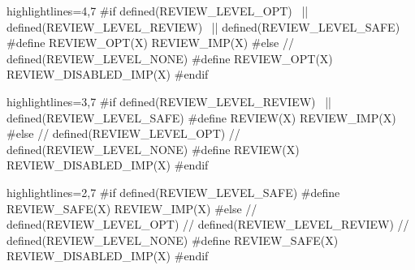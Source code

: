 \begin{frame}[fragile]
\begin{overprint}
\begin{cppcodebox*}{highlightlines={4,7}}
#if defined(REVIEW_LEVEL_OPT)    \
 || defined(REVIEW_LEVEL_REVIEW) \
 || defined(REVIEW_LEVEL_SAFE)
#define REVIEW_OPT(X) REVIEW_IMP(X)
#else
 // defined(REVIEW_LEVEL_NONE)
#define REVIEW_OPT(X) REVIEW_DISABLED_IMP(X)
#endif
\end{cppcodebox*}

\begin{cppcodebox*}{highlightlines={3,7}}
#if defined(REVIEW_LEVEL_REVIEW) \
 || defined(REVIEW_LEVEL_SAFE)
#define REVIEW(X) REVIEW_IMP(X)
#else
 // defined(REVIEW_LEVEL_OPT)
 // defined(REVIEW_LEVEL_NONE)
#define REVIEW(X) REVIEW_DISABLED_IMP(X)
#endif
\end{cppcodebox*}

\begin{cppcodebox*}{highlightlines={2,7}}
#if defined(REVIEW_LEVEL_SAFE)
#define REVIEW_SAFE(X) REVIEW_IMP(X)
#else
 // defined(REVIEW_LEVEL_OPT)
 // defined(REVIEW_LEVEL_REVIEW)
 // defined(REVIEW_LEVEL_NONE)
#define REVIEW_SAFE(X) REVIEW_DISABLED_IMP(X)
#endif
\end{cppcodebox*}

\end{overprint}
  
\end{frame}

